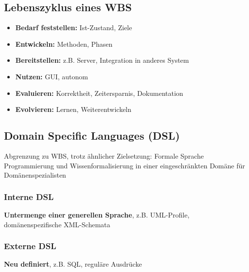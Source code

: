 \documentclass[14pt]{article}
\begin{document}
    \subsection{Lebenszyklus eines WBS}
    \begin{itemize}
        \item \textbf{Bedarf feststellen:} Ist-Zustand, Ziele
        \item \textbf{Entwickeln:} Methoden, Phasen
        \item \textbf{Bereitstellen:} z.B. Server, Integration in 
        anderes System
        \item \textbf{Nutzen:} GUI, autonom
        \item \textbf{Evaluieren:} Korrektheit, Zeitersparnis,
        Dokumentation
        \item \textbf{Evolvieren:} Lernen, Weiterentwickeln
    \end{itemize}

    \subsection{Domain Specific Languages (DSL)}
    Abgrenzung zu WBS, trotz ähnlicher Zielsetzung: Formale Sprache 
    Programmierung und Wissenformalisierung in einer eingeschränkten
    Domäne für Domänenspezialisten \\
    \subsubsection{Interne DSL}
    \textbf{Untermenge einer generellen Sprache}, z.B. UML-Profile, 
    domänenspezifische XML-Schemata
    \subsubsection{Externe DSL}
    \textbf{Neu definiert}, z.B. SQL, reguläre Ausdrücke
\end{document}

